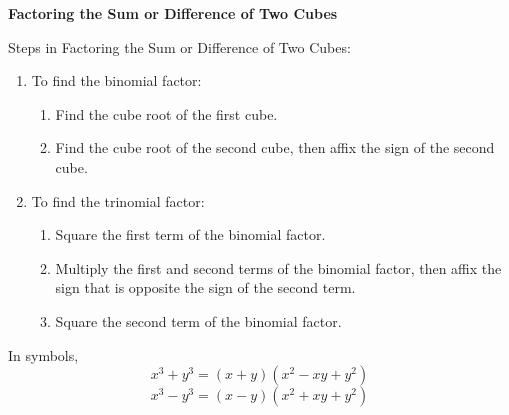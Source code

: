 \begin{center}
\textbf{Factoring the Sum or Difference of Two Cubes}
\end{center}

\vspace*{1ex}

Steps in Factoring the Sum or Difference of Two Cubes:

\begin{enumerate}[label = \Alph*. ]
\item To find the binomial factor: 
	\begin{enumerate}[label = \alph*. ]
		\item Find the cube root of the first cube.  
		\item Find the cube root of the second cube, then affix the sign of the second cube.    
	\end{enumerate}
	
\item To find the trinomial factor: 
	\begin{enumerate}[label = \alph*. ]
		\item Square the first term of the binomial factor. 
		\item Multiply the first and second terms of the binomial factor, then affix the sign that is opposite the sign of the second term. 
		\item Square the second term of the binomial factor. 
	\end{enumerate}
\end{enumerate}

\vspce

In symbols, 
$$\displaystyle x^{3}+y^{3} = (x+y)(x^{2}-xy+y^{2}) $$
$$\displaystyle x^{3}-y^{3} = (x-y)(x^{2}+xy+y^{2})  $$
